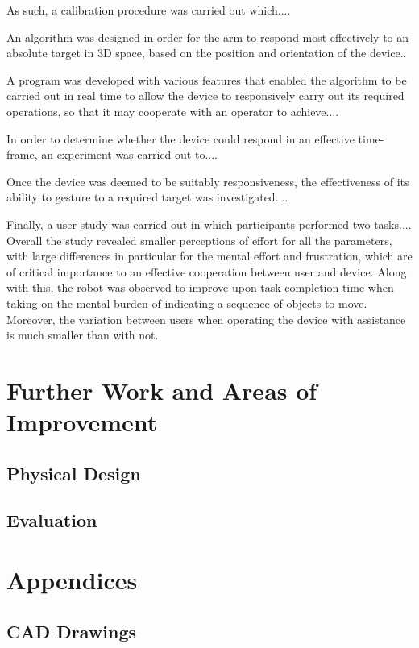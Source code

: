 \documentclass[11pt]{article}
\begin{document}
As such, a calibration procedure was carried out which....

An algorithm was designed in order for the arm to respond most effectively to an absolute target in 3D space, based on the position and orientation of the device..

A program was developed with various features that enabled the algorithm to be carried out in real time to allow the device to responsively carry out its required operations, so that it may cooperate with an operator to achieve....

In order to determine whether the device could respond in an effective time-frame, an experiment was carried out to....


Once the device was deemed to be suitably responsiveness, the effectiveness of its ability to gesture to a required target was investigated....

Finally, a user study was carried out in which participants performed two tasks....
Overall the study revealed smaller perceptions of effort for all the parameters, with large differences in particular for the mental effort and frustration, which are of critical importance to an effective cooperation between user and device. Along with this, the robot was observed to improve upon task completion time when taking on the mental burden of indicating a sequence of objects to move. Moreover, the variation between users when operating the device with assistance is much smaller than with not.


\section{Further Work and Areas of Improvement}
\subsection{Physical Design}
\subsection{Evaluation}

\pagebreak



\pagebreak
\section{Appendices}
\subsection{CAD Drawings}
\end{document}
